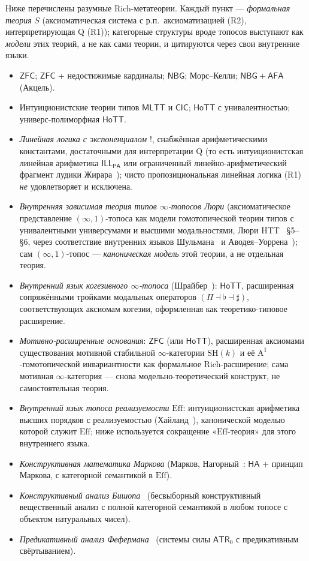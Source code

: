 \documentclass[11pt]{article}
\theoremstyle{plain}
\theoremstyle{definition}
\newcommand{\ZFC}{\mathsf{ZFC}}
\newcommand{\MLTT}{\mathsf{MLTT}}
\newcommand{\HoTT}{\mathsf{HoTT}}
\newcommand{\CIC}{\mathsf{CIC}}
\newcommand{\NBG}{\mathsf{NBG}}
\newcommand{\AFA}{\mathsf{AFA}}
\begin{document}
Ниже перечислены разумные Rich-метатеории. Каждый пункт — \emph{формальная теория} $S$ (аксиоматическая система с р.п.\ аксиоматизацией (R2), интерпретирующая Q (R1)); категорные структуры вроде топосов выступают как \emph{модели} этих теорий, а не как сами теории, и цитируются через свои внутренние языки.
\begin{itemize}
\item $\ZFC$; $\ZFC$ + недостижимые кардиналы; $\NBG$; Морс--Келли; $\NBG + \AFA$ (Акцель).
\item Интуиционистские теории типов $\MLTT$ и $\CIC$; $\HoTT$ с унивалентностью; универс-полиморфная $\HoTT$.
\item \emph{Линейная логика с экспоненциалом} $!$, снабжённая арифметическими константами, достаточными для интерпретации Q (то есть интуиционистская линейная арифметика $\mathsf{ILL}_{\mathsf{PA}}$ или ограниченный линейно-арифметический фрагмент лудики Жирара~\cite{Girard2001}); чисто пропозициональная линейная логика (R1) \emph{не} удовлетворяет и исключена.
\item \emph{Внутренняя зависимая теория типов $\infty$-топосов Люри} (аксиоматическое представление $(\infty, 1)$-топоса как модели гомотопической теории типов с унивалентными универсумами и высшими модальностями, Люри HTT~\cite{LurieHTT} \S 5--\S 6, через соответствие внутренних языков Шульмана~\cite{Shulman2019} и Аводея--Уоррена~\cite{AwodeyWarren2009}); сам $(\infty, 1)$-топос — \emph{каноническая модель} этой теории, а не отдельная теория.
\item \emph{Внутренний язык когезивного $\infty$-топоса} (Шрайбер~\cite{Schreiber2013}): $\HoTT$, расширенная сопряжёнными тройками модальных операторов $(\Pi \dashv \flat \dashv \sharp)$, соответствующих аксиомам когезии, оформленная как теоретико-типовое расширение.
\item \emph{Мотивно-расширенные основания}: $\ZFC$ (или $\HoTT$), расширенная аксиомами существования мотивной стабильной $\infty$-категории $\mathrm{SH}(k)$ и её $\mathrm{A}^1$-гомотопической инвариантности как формальное Rich-расширение; сама мотивная $\infty$-категория — снова модельно-теоретический конструкт, не самостоятельная теория.
\item \emph{Внутренний язык топоса реализуемости} $\mathrm{Eff}$: интуиционистская арифметика высших порядков с реализуемостью (Хайланд~\cite{Hyland1982}), канонической моделью которой служит $\mathrm{Eff}$; ниже используется сокращение «$\mathrm{Eff}$-теория» для этого внутреннего языка.
\item \emph{Конструктивная математика Маркова} (Марков, Нагорный~\cite{MarkovNagornyj1988}: $\mathsf{HA}$ + принцип Маркова, с категорной семантикой в $\mathrm{Eff}$).
\item \emph{Конструктивный анализ Бишопа}~\cite{Bishop1967,BridgesVita2006} (бесвыборный конструктивный вещественный анализ с полной категорной семантикой в любом топосе с объектом натуральных чисел).
\item \emph{Предикативный анализ Фефермана}~\cite{Feferman1964} (системы силы $\mathsf{ATR}_0$ с предикативным свёртыванием).
\end{itemize}
\end{document}
